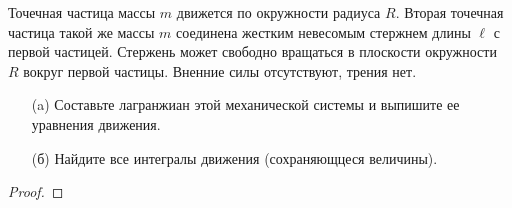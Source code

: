 \begin{prob}
Точечная частица массы $m$ движется по окружности радиуса $R$. Вторая точечная частица такой же массы $m$ соединена жестким невесомым стержнем длины $\ell$ с первой частицей. Стержень может свободно вращаться в плоскости окружности $R$ вокруг первой частицы. Вненние силы отсутствуют, трения нет.
\begin{itemize}
\item[]
\item[(a)] Составьте лагранжиан этой механической системы и выпишите ее уравнения движения.
\item[(б)] Найдите все интегралы движения (сохраняющцеся величины).
\end{itemize}
\end{prob}

\begin{proof}

\end{proof}

